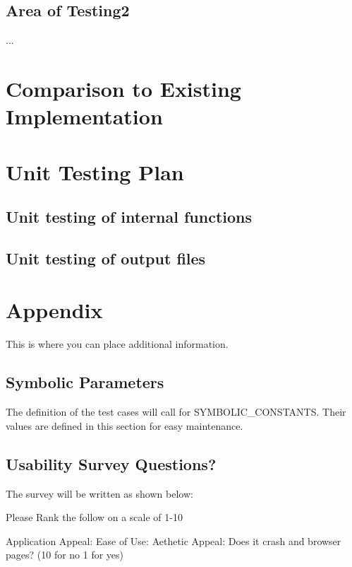 \documentclass[12pt, titlepage]{article}
\begin{document}
\subsection{Area of Testing2}
...
	
\section{Comparison to Existing Implementation}	
				
\section{Unit Testing Plan}
		
\subsection{Unit testing of internal functions}
		
\subsection{Unit testing of output files}		


\newpage
\section{Appendix}
This is where you can place additional information.
\subsection{Symbolic Parameters}
The definition of the test cases will call for SYMBOLIC\_CONSTANTS.
Their values are defined in this section for easy maintenance.
\subsection{Usability Survey Questions?}
The survey will be written as shown below:

Please Rank the follow on a scale of 1-10

Application Appeal:
Ease of Use:
Aethetic Appeal:
Does it crash and browser pages? (10 for no 1 for yes)
\end{document}
